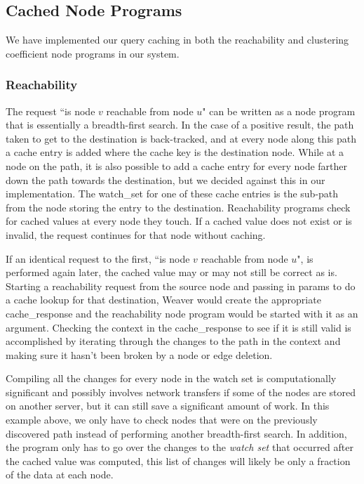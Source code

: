 \documentclass[letterpaper,twocolumn,11pt,tight]{article}
\begin{document}
\subsection{Cached Node Programs}\label{sec:cached_progs}
We have implemented our query caching in both the reachability and clustering coefficient node programs in our system.

\subsubsection{Reachability}
The request ``is node $v$ reachable from node $u$" can be written as a node program that is essentially a breadth-first search.
In the case of a positive result, the path taken to get to the destination is back-tracked, and at every node along this path a cache entry is added where the cache key is the destination node.
While at a node on the path, it is also possible to add a cache entry for every node farther down the path towards the destination, but we decided against this in our implementation.
The watch\_set for one of these cache entries is the sub-path from the node storing the entry to the destination. Reachability programs check for cached values at every node they touch. If a cached value does not exist or is invalid, the request continues for that node without caching.

    If an identical request to the first, ``is node $v$ reachable from node $u$", is performed again later, the cached value may or may not still be correct as is.
    Starting a reachability request from the source node and passing in params to do a cache lookup for that destination, Weaver would create the appropriate cache\_response and the reachability node program would be started with it as an argument.
    Checking the context in the cache\_response to see if it is still valid is accomplished by iterating through the changes to the path in the context and making sure it hasn't been broken by a node or edge deletion.
    
    Compiling all the changes for every node in the watch set is computationally significant and possibly involves network transfers if some of the nodes are stored on another server, but it can still save a significant amount of work. In this example above, we only have to check nodes that were on the previously discovered path instead of performing another breadth-first search.
    In addition, the program only has to go over the changes to the \emph{watch set} that occurred after the cached value was computed, this list of changes will likely be only a fraction of the data at each node.
\end{document}
